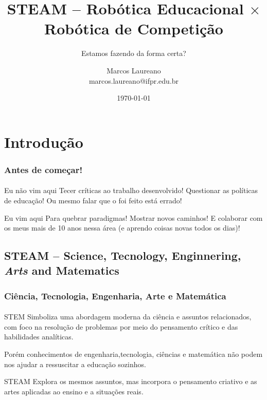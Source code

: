 \documentclass{beamer}
\author{Marcos Laureano\\marcos.laureano@ifpr.edu.br}
\title{STEAM -- Robótica Educacional $\times$ Robótica de Competição}
\subtitle{Estamos fazendo da forma certa?}
\institute{Laboratório de Robótica e Computação Aplicada do Campus Pinhais -- Instituto Federal do Paraná}
\date{\today}
\begin{document}
\begin{frame}[t,plain]
\titlepage
\end{frame}




\section[Sumário]{}
\frame{\tableofcontents}

\section{Introdução}

\begin{frame}
\frametitle{Antes de começar!}
\framesubtitle{}
   \begin{block}{Eu não vim aqui}
   Tecer críticas ao trabalho desenvolvido! Questionar as políticas de educação!
   Ou mesmo falar que o foi feito está errado!
   \end{block}
   \begin{block}{Eu vim aqui}
   Para quebrar paradigmas! Mostrar novos caminhos! E colaborar com os meus mais de 10 anos nessa área (e aprendo coisas novas todos os dias)!
   \end{block}
\end{frame}

\subsection{STEAM -- Science, Tecnology, Enginnering, \emph{Arts} and Matematics}

\begin{frame}
\frametitle{Ciência, Tecnologia, Engenharia, Arte e Matemática}
\framesubtitle{}
   \begin{block}{STEM}
   Simboliza uma abordagem moderna da ciência e assuntos relacionados, com foco na resolução de problemas por meio do pensamento crítico e das habilidades analíticas.
   \end{block}
   \begin{block}{Porém}
   conhecimentos de engenharia,tecnologia, ciências e matemática não podem nos ajudar a ressuscitar a educação sozinhos.
   \end{block}
   \begin{block}{STEAM}
   Explora os mesmos assuntos, mas incorpora o pensamento criativo e as artes aplicadas ao ensino e a situações reais.
   \end{block}
\end{frame}
\end{document}
